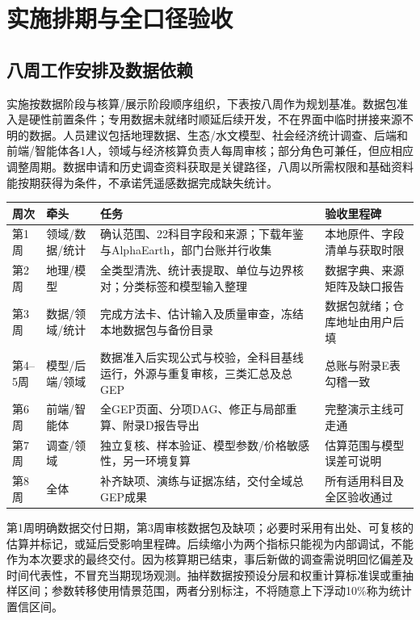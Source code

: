 \documentclass[12pt,a4paper,fontset=fandol]{ctexart}
\begin{document}
\section{实施排期与全口径验收}
\subsection{八周工作安排及数据依赖}
实施按数据阶段与核算/展示阶段顺序组织，下表按八周作为规划基准。数据包准入是硬性前置条件；专用数据未就绪时顺延后续开发，不在界面中临时拼接来源不明的数据。人员建议包括地理数据、生态/水文模型、社会经济统计调查、后端和前端/智能体各1人，领域与经济核算负责人每周审核；部分角色可兼任，但应相应调整周期。数据申请和历史调查资料获取是关键路径，八周以所需权限和基础资料能按期获得为条件，不承诺凭遥感数据完成缺失统计。

{\small
\begin{longtable}{P{1.2cm}P{2.5cm}P{5.4cm}P{3.7cm}}
\toprule 周次 & 牵头 & 任务 & 验收里程碑 \\\midrule\endhead
第1周 & 领域/数据/统计 & 确认范围、22科目字段和来源；下载年鉴与AlphaEarth，部门台账并行收集 & 本地原件、字段清单与获取时限 \\
第2周 & 地理/模型 & 全类型清洗、统计表提取、单位与边界核对；分类标签和模型输入整理 & 数据字典、来源矩阵及缺口报告 \\
第3周 & 数据/领域/统计 & 完成方法卡、估计输入及质量审查，冻结本地数据包与备份目录 & 数据包就绪；仓库地址由用户后填 \\
第4--5周 & 模型/后端/领域 & 数据准入后实现公式与校验，全科目基线运行，外源与重复审核，三类汇总及总GEP & 总账与附录E表勾稽一致 \\
第6周 & 前端/智能体 & 全GEP页面、分项DAG、修正与局部重算、附录D报告导出 & 完整演示主线可走通 \\
第7周 & 调查/领域 & 独立复核、样本验证、模型参数/价格敏感性，另一环境复算 & 估算范围与模型误差可说明 \\
第8周 & 全体 & 补齐缺项、演练与证据冻结，交付全域总GEP成果 & 所有适用科目及全区验收通过 \\
\bottomrule
\end{longtable}}
第1周明确数据交付日期，第3周审核数据包及缺项；必要时采用有出处、可复核的估算并标记，或延后受影响里程碑。后续缩小为两个指标只能视为内部调试，不能作为本次要求的最终交付。因为核算期已结束，事后新做的调查需说明回忆偏差及时间代表性，不冒充当期现场观测。抽样数据按预设分层和权重计算标准误或重抽样区间；参数转移使用情景范围，两者分别标注，不将随意上下浮动10\%称为统计置信区间。
\end{document}
